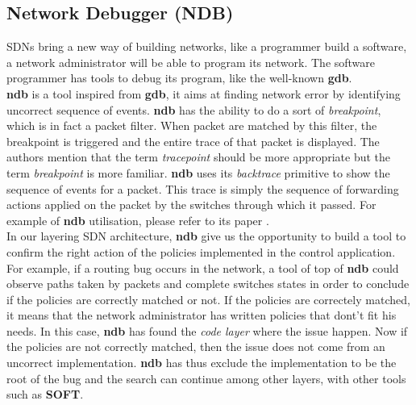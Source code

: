 \documentclass[10pt,article]{IEEEtran}
\begin{document}
\subsection{Network Debugger (NDB)}
SDNs bring a new way of building networks, like a programmer build a software, a network administrator will be able to program its network. The software programmer has tools to debug its program, like the well-known \textbf{gdb}.\\
\textbf{ndb} is a tool inspired from \textbf{gdb}, it aims at finding network error by identifying uncorrect sequence of events. \textbf{ndb} has the ability to do a sort of \textit{breakpoint}, which is in fact a packet filter. When packet are matched by this filter, the breakpoint is triggered and the entire trace of that packet is displayed. The authors mention that the term \textit{tracepoint} should be more appropriate but the term \textit{breakpoint} is more familiar. \textbf{ndb} uses its \textit{backtrace} primitive to show the sequence of events for a packet. This trace is simply the sequence of forwarding actions applied on the packet by the switches through which it passed. For example of \textbf{ndb} utilisation, please refer to its paper \cite{ndb paper}.\\
In our layering SDN architecture, \textbf{ndb} give us the opportunity to build a tool to confirm the right action of the policies implemented in the control application. For example, if a routing bug occurs in the network, a tool of top of \textbf{ndb} could observe paths taken by packets and complete switches states in order to conclude if the policies are correctly matched or not. If the policies are correctely matched, it means that the network administrator has written policies that dont't fit his needs. In this case, \textbf{ndb} has found the \textit{code layer} where the issue happen. Now if the policies are not correctly matched, then the issue does not come from an uncorrect implementation. \textbf{ndb} has thus exclude the implementation to be the root of the bug and the search can continue among other layers, with other tools such as \textbf{SOFT}\cite{SOFT paper}.
\end{document}
